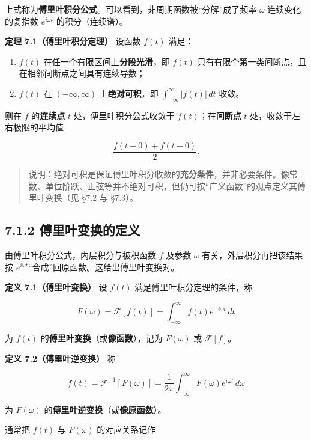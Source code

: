 上式称为\textbf{傅里叶积分公式}。可以看到，非周期函数被``分解''成了频率
\(\omega\) 连续变化的复指数 \(e^{i\omega t}\) 的积分（连续谱）。

\textbf{定理 7.1（傅里叶积分定理）} 设函数 \(f(t)\) 满足：

\begin{enumerate}
\def\labelenumi{\arabic{enumi}.}
\tightlist
\item
  \(f(t)\) 在任一个有限区间上\textbf{分段光滑}，即 \(f(t)\)
  只有有限个第一类间断点，且在相邻间断点之间具有连续导数；
\item
  \(f(t)\) 在 \((-\infty,\infty)\) 上\textbf{绝对可积}，即
  \(\displaystyle\int_{-\infty}^{\infty}|f(t)|\,dt\) 收敛。
\end{enumerate}

则在 \(f\) 的\textbf{连续点} \(t\) 处，傅里叶积分公式收敛于
\(f(t)\)；在\textbf{间断点} \(t\) 处，收敛于左右极限的平均值

\[
\frac{f(t+0)+f(t-0)}{2}.
\]

\begin{quote}
说明：绝对可积是保证傅里叶积分收敛的\textbf{充分条件}，并非必要条件。像常数、单位阶跃、正弦等并不绝对可积，但仍可按``广义函数''的观点定义其傅里叶变换（见
§7.2 与 §7.3）。
\end{quote}

\subsection{7.1.2
傅里叶变换的定义}\label{ux5085ux91ccux53f6ux53d8ux6362ux7684ux5b9aux4e49}

由傅里叶积分公式，内层积分与被积函数 \(f\) 及参数 \(\omega\)
有关，外层积分再把该结果按
\(e^{i\omega t}\)``合成''回原函数。这给出傅里叶变换对。

\textbf{定义 7.1（傅里叶变换）} 设 \(f(t)\) 满足傅里叶积分定理的条件，称

\[
F(\omega)=\mathcal{F}[f(t)]=\int_{-\infty}^{\infty}f(t)e^{-i\omega t}\,dt
\]

为 \(f(t)\) 的\textbf{傅里叶变换}（或\textbf{像函数}），记为
\(F(\omega)\) 或 \(\mathcal F[f]\)。

\textbf{定义 7.2（傅里叶逆变换）} 称

\[
f(t)=\mathcal{F}^{-1}[F(\omega)]=\frac{1}{2\pi}\int_{-\infty}^{\infty}F(\omega)e^{i\omega t}\,d\omega
\]

为 \(F(\omega)\) 的\textbf{傅里叶逆变换}（或\textbf{像原函数}）。

通常把 \(f(t)\) 与 \(F(\omega)\) 的对应关系记作

